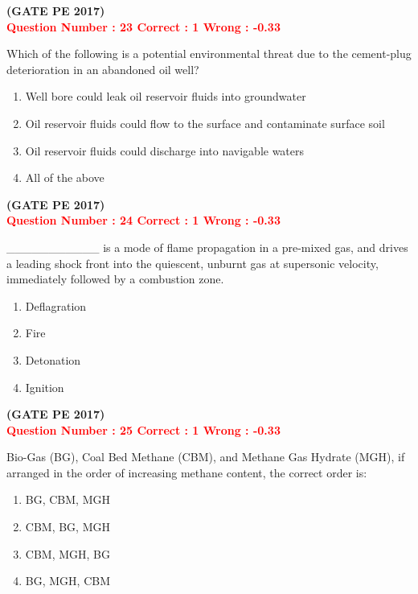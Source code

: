 \documentclass[journal,12pt,onecolumn]{article}
\begin{document}
{\hfill\textbf{(GATE PE 2017)}\\[0.6cm]



\textcolor{red}{\textbf{Question Number : 23 \hfill Correct : 1  Wrong : -0.33}}

Which of the following is a potential environmental threat due to the cement-plug deterioration in an abandoned oil well?

\begin{enumerate}[label=(\Alph*)]
    \item Well bore could leak oil reservoir fluids into groundwater
    \item Oil reservoir fluids could flow to the surface and contaminate surface soil
    \item Oil reservoir fluids could discharge into navigable waters
    \item All of the above
\end{enumerate}
\hfill\textbf{(GATE PE 2017)}\\[0.6cm]

\textcolor{red}{\textbf{Question Number : 24 \hfill Correct : 1  Wrong : -0.33}}

\_\_\_\_\_\_\_\_\_\_\_ is a mode of flame propagation in a pre-mixed gas, and drives a leading shock front into the quiescent, unburnt gas at supersonic velocity, immediately followed by a combustion zone.

\begin{enumerate}[label=(\Alph*)]
    \item Deflagration
    \item Fire
    \item Detonation
    \item Ignition
\end{enumerate}

\hfill\textbf{(GATE PE 2017)}\\[0.6cm]

\textcolor{red}{\textbf{Question Number : 25 \hfill Correct : 1  Wrong : -0.33}}

Bio-Gas (BG), Coal Bed Methane (CBM), and Methane Gas Hydrate (MGH), if arranged in the order of increasing methane content, the correct order is:

\begin{enumerate}[label=(\Alph*)]
    \item BG, CBM, MGH
    \item CBM, BG, MGH
    \item CBM, MGH, BG
    \item BG, MGH, CBM
\end{enumerate}

}
\end{document}
